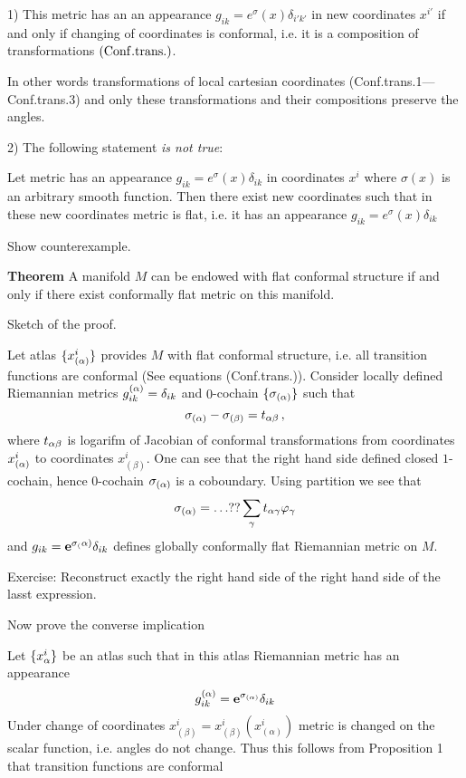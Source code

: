    1) This metric has an an appearance $g_{ik}=e^\sigma(x)\delta_{i'k'}$ in new coordinates
   $x^{i'}$ if and only if changing of coordinates is conformal, i.e. it is a composition of transformations
   $ ({\rm Conf. trans. })$.

In other words transformations of local cartesian coordinates (Conf.trans.1---Conf.trans.3) and only these transformations
and their compositions preserve the angles.

   2)  The following statement {\it is not true}:

     Let metric has an appearance $g_{ik}=e^\sigma(x)\delta_{ik}$ in coordinates $x^i$ where
     $\sigma(x)$ is an arbitrary smooth function. Then there exist new coordinates
     such that in these new coordinates  metric is flat, i.e. it has an appearance $g_{ik}=e^\sigma(x)\delta_{ik}$


   Show counterexample.

 \medskip




  {\bf Theorem}   A manifold $M$ can be endowed with flat conformal structure if and only if
   there exist conformally flat metric on this manifold.


\medskip


   Sketch of the proof.

   Let atlas $\{x^i_{(\alpha)}\}$ provides $M$ with flat conformal structure, i.e. all transition functions are
   conformal (See equations (Conf.trans.)). Consider  locally defined Riemannian metrics
   $g_{ik}^{(\alpha)}=\delta_{ik}$ and $0$-cochain $\{\sigma_{(\alpha)}\}$ such that
                $$
             \sigma_{(\alpha)}-\sigma_{(\beta)}=t_{\alpha\beta}\,,
                $$
where $t_{\alpha\beta}$ is logarifm of Jacobian of conformal transformations from coordinates $x^i_{(\alpha)}$
to coordinates $x^i_{(\beta)}$. One can see that the right hand side defined closed $1$-cochain, hence
$0$-cochain $\sigma_{(\alpha)}$ is a coboundary. Using partition we see that
                 $$
               \sigma_{(\alpha)}=\dots ?? \sum_\gamma t_{\alpha\gamma}\varphi_\gamma
                 $$
and $g_{ik}={\bf e}^{\sigma_(\alpha)}\delta_{ik}$ defines globally conformally flat Riemannian metric on $M$.

 Exercise:  Reconstruct exactly the right hand side of  the right hand side of the lasst expression.

\medskip


Now prove the converse implication

  Let $\{x^i_{\alpha}\}$ be an atlas such that in this atlas Riemannian metric has an appearance
              $$
              g_{ik}^{(\alpha)}={\bf e}^{\sigma_{(\alpha)}}\delta_{ik}
              $$
Under change of coordinates $x^i_{(\beta)}=x^i_{(\beta)}(x^i_{(\alpha)})$
metric is changed on the scalar function, i.e. angles do not change. Thus this follows from
Proposition 1 that transition functions are conformal \finish





